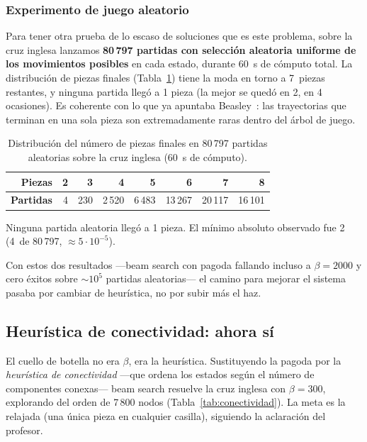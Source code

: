 \documentclass[conference,a4paper]{IEEEtran}
\begin{document}
\subsubsection{Experimento de juego aleatorio}

Para tener otra prueba de lo escaso de soluciones que es este problema,
sobre la cruz inglesa lanzamos \textbf{80\,797 partidas con selección
aleatoria uniforme de los movimientos posibles} en cada estado, durante
60~s de cómputo total. La distribución de piezas finales
(Tabla~\ref{tab:aleatorio}) tiene la moda en torno a 7~piezas
restantes, y ninguna partida llegó a 1 pieza (la mejor se quedó en 2,
en 4 ocasiones). Es coherente con lo que ya apuntaba
Beasley~\cite{senku-counts}: las trayectorias que terminan en una sola
pieza son extremadamente raras dentro del árbol de juego.

\begin{table}[!htbp]
\caption{Distribución del número de piezas finales en 80\,797 partidas aleatorias sobre la cruz inglesa (60~s de cómputo).}
\label{tab:aleatorio}
\centering
\begin{tabular}{rrrrrrrr}
\toprule
\textbf{Piezas} & 2 & 3 & 4 & 5 & 6 & 7 & 8 \\
\midrule
\textbf{Partidas} & 4 & 230 & 2\,520 & 6\,483 & 13\,267 & 20\,117 & 16\,101 \\
\bottomrule
\end{tabular}
\par\smallskip
\footnotesize Ninguna partida aleatoria llegó a 1 pieza. El mínimo
absoluto observado fue 2 (4~de 80\,797, $\approx\! 5 \cdot 10^{-5}$).
\end{table}

Con estos dos resultados ---beam search con pagoda fallando incluso a
$\beta=2000$ y cero éxitos sobre $\sim 10^5$ partidas aleatorias--- el
camino para mejorar el sistema pasaba por cambiar de heurística, no por
subir más el haz.


\subsection{Heurística de conectividad: ahora sí}

El cuello de botella no era $\beta$, era la heurística. Sustituyendo la
pagoda por la \emph{heurística de conectividad} ---que ordena los
estados según el número de componentes conexas--- beam search resuelve
la cruz inglesa con $\beta=300$, explorando del orden de 7\,800 nodos
(Tabla~\ref{tab:conectividad}). La meta es la relajada (una única pieza
en cualquier casilla), siguiendo la aclaración del profesor.
\end{document}

